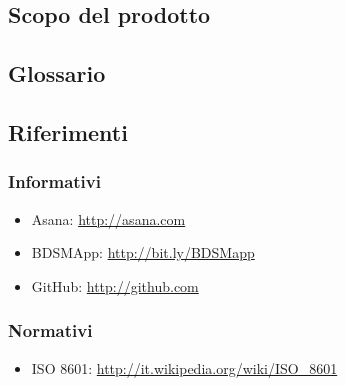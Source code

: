 \subsection{Scopo del prodotto}
	\productScope

\subsection{Glossario}
	\glossarioDesc

\subsection{Riferimenti}

\subsubsection{Informativi}
\begin{itemize}
\item Asana: \url{http://asana.com}
\item BDSMApp: \url{http://bit.ly/BDSMapp}
\item GitHub: \url{http://github.com}
\end{itemize}

\subsubsection{Normativi}
\begin{itemize}
\item ISO 8601: \url{http://it.wikipedia.org/wiki/ISO_8601}
\end{itemize}